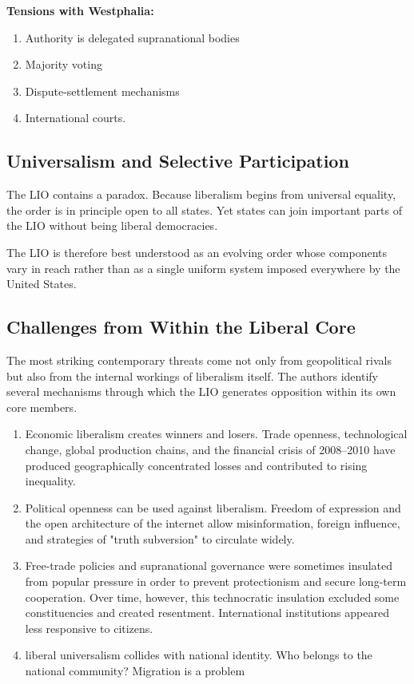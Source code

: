 \textbf{Tensions with Westphalia:}
\begin{enumerate}
    \item Authority is delegated supranational bodies
    \item Majority voting
    \item Dispute-settlement mechanisms
    \item International courts.
\end{enumerate}

\subsection{Universalism and Selective Participation}

The LIO contains a paradox. Because liberalism begins from universal equality, the order is in principle open to all states. Yet states can join important parts of the LIO without being liberal democracies.

The LIO is therefore best understood as an evolving order whose components vary in reach rather than as a single uniform system imposed everywhere by the United States.

\subsection{Challenges from Within the Liberal Core}

The most striking contemporary threats come not only from geopolitical rivals but also from the internal workings of liberalism itself. The authors identify several mechanisms through which the LIO generates opposition within its own core members.

\begin{enumerate}
    \item Economic liberalism creates winners and losers. Trade openness, technological change, global production chains, and the financial crisis of 2008--2010 have produced geographically concentrated losses and contributed to rising inequality.
    \item Political openness can be used against liberalism. Freedom of expression and the open architecture of the internet allow misinformation, foreign influence, and strategies of "truth subversion" to circulate widely. 
    \item Free-trade policies and supranational governance were sometimes insulated from popular pressure in order to prevent protectionism and secure long-term cooperation. Over time, however, this technocratic insulation excluded some constituencies and created resentment. International institutions appeared less responsive to citizens.
    \item liberal universalism collides with national identity. Who belongs to the national community? Migration is a problem
\end{enumerate}

